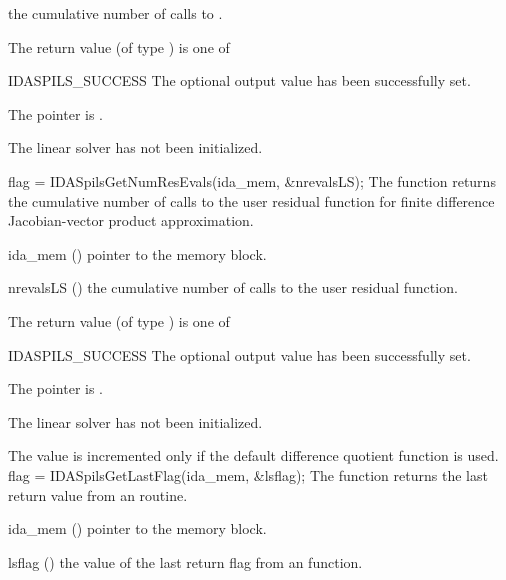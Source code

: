{{\begin{args}[njvevals]
    the cumulative number of calls to .
  \end{args}
}
{
  The return value  (of type ) is one of
  \begin{args}
  \item[IDASPILS\_SUCCESS] 
    The optional output value has been successfully set.
  \item[\Id{IDASPILS\_MEM\_NULL}]
    The  pointer is .
  \item[\Id{IDASPILS\_LMEM\_NULL}]
    The {\idaspils} linear solver has not been initialized.
  \end{args}
}
{}
{
  flag = IDASpilsGetNumResEvals(ida\_mem, \&nrevalsLS);
}
{
  The function  returns the
  cumulative number of calls to the user residual function for
  finite difference Jacobian-vector product approximation.
}
{
  \begin{args}[nrevalsLS]
  \item[ida\_mem] ()
    pointer to the {\idas} memory block.
  \item[nrevalsLS] ()
    the cumulative number of calls to the user residual function.
  \end{args}
}
{
  The return value  (of type ) is one of
  \begin{args}
  \item[IDASPILS\_SUCCESS] 
    The optional output value has been successfully set.
  \item[\Id{IDASPILS\_MEM\_NULL}]
    The  pointer is .
  \item[\Id{IDASPILS\_LMEM\_NULL}]
    The {\idaspils} linear solver has not been initialized.
  \end{args}
}
{
  The value  is incremented only if the default 
   difference quotient function is used.
}
{
  flag = IDASpilsGetLastFlag(ida\_mem, \&lsflag);
}
{
  The function  returns the
  last return value from an {\idaspils} routine. 
}
{
  \begin{args}
  \item[ida\_mem] ()
    pointer to the {\idas} memory block.
  \item[lsflag] ()
    the value of the last return flag from an {\idaspils} function.
  \end{args}
}}

